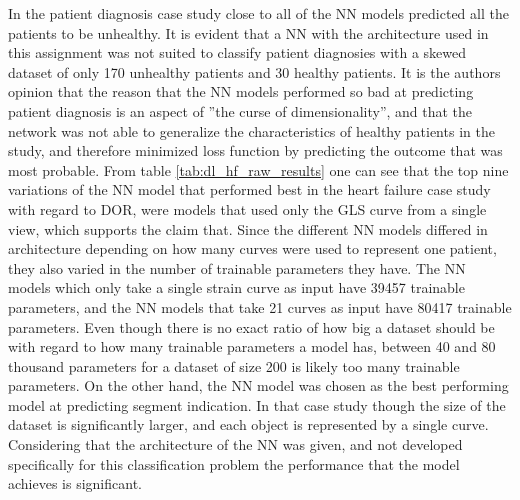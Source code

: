In the patient diagnosis case study close to all of the NN models predicted all the patients to be unhealthy. It is evident that a NN with the architecture used in this assignment was not suited to classify patient diagnosies with a skewed dataset of only 170 unhealthy patients and 30 healthy patients. It is the authors opinion that the reason that the NN models performed so bad at predicting patient diagnosis is an aspect of ''the curse of dimensionality'', and that the network was not able to generalize the characteristics of healthy patients in the study, and therefore minimized loss function by predicting the outcome that was most probable. From table \ref{tab:dl_hf_raw_results} one can see that the top nine variations of the NN model that performed best in the heart failure case study with regard to DOR, were models that used only the GLS curve from a single view, which supports the claim that. Since the different NN models differed in architecture depending on how many curves were used to represent one patient, they also varied in the number of trainable parameters they have. The NN models which only take a single strain curve as input have 39457 trainable parameters, and the NN models that take 21 curves as input have 80417 trainable parameters. Even though there is no exact ratio of how big a dataset should be with regard to how many trainable parameters a model has, between 40 and 80 thousand parameters for a dataset of size 200 is likely too many trainable parameters. On the other hand, the NN model was chosen as the best performing model at predicting segment indication. In that case study though the size of the dataset is significantly larger, and each object is represented by a single curve. Considering that the architecture of the NN was given, and not developed specifically for this classification problem the performance that the model achieves is significant. 
